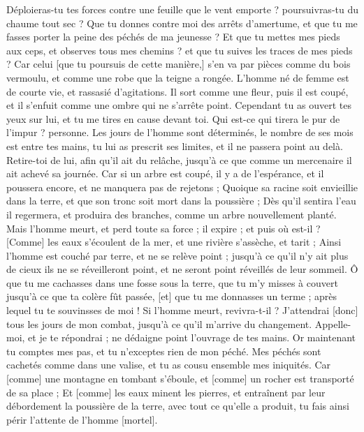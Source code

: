 \begin{multicols}{2}
Déploieras-tu tes forces contre une feuille que le vent emporte ? poursuivras-tu du chaume tout sec ?
Que tu donnes contre moi des arrêts d'amertume, et que tu me fasses porter la peine des péchés de ma jeunesse ?
Et que tu mettes mes pieds aux ceps, et observes tous mes chemins ? et que tu suives les traces de mes pieds ?
Car celui [que tu poursuis de cette manière,] s'en va par pièces comme du bois vermoulu, et comme une robe que la teigne a rongée.
\VerseOne{}L'homme né de femme est de courte vie, et rassasié d'agitations.
Il sort comme une fleur, puis il est coupé, et il s'enfuit comme une ombre qui ne s'arrête point.
Cependant tu as ouvert tes yeux sur lui, et tu me tires en cause devant toi.
Qui est-ce qui tirera le pur de l'impur ? personne.
Les jours de l'homme sont déterminés, le nombre de ses mois est entre tes mains, tu lui as prescrit ses limites, et il ne passera point au delà.
Retire-toi de lui, afin qu'il ait du relâche, jusqu'à ce que comme un mercenaire il ait achevé sa journée.
Car si un arbre est coupé, il y a de l'espérance, et il poussera encore, et ne manquera pas de rejetons ;
Quoique sa racine soit envieillie dans la terre, et que son tronc soit mort dans la poussière ;
Dès qu'il sentira l'eau il regermera, et produira des branches, comme un arbre nouvellement planté.
Mais l'homme meurt, et perd toute sa force ; il expire ; et puis où est-il ?
[Comme] les eaux s'écoulent de la mer, et une rivière s'assèche, et tarit ;
Ainsi l'homme est couché par terre, et ne se relève point ; jusqu'à ce qu'il n'y ait plus de cieux ils ne se réveilleront point, et ne seront point réveillés de leur sommeil.
Ô que tu me cachasses dans une fosse sous la terre, que tu m'y misses à couvert jusqu'à ce que ta colère fût passée, [et] que tu me donnasses un terme ; après lequel tu te souvinsses de moi !
Si l'homme meurt, revivra-t-il ? J'attendrai [donc] tous les jours de mon combat, jusqu'à ce qu'il m'arrive du changement.
Appelle-moi, et je te répondrai ; ne dédaigne point l'ouvrage de tes mains.
Or maintenant tu comptes mes pas, et tu n'exceptes rien de mon péché.
Mes péchés sont cachetés comme dans une valise, et tu as cousu ensemble mes iniquités.
Car [comme] une montagne en tombant s'éboule, et [comme] un rocher est transporté de sa place ;
Et [comme] les eaux minent les pierres, et entraînent par leur débordement la poussière de la terre, avec tout ce qu'elle a produit, tu fais ainsi périr l'attente de l'homme [mortel].

\end{multicols}
